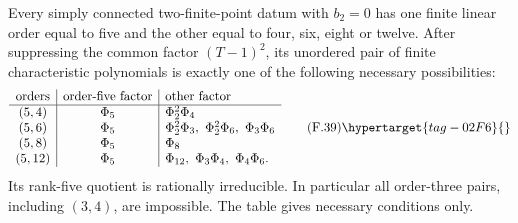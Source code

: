 \begin{theorem}\hypertarget{tag-02N3}{}\label{maps:src:F.2.14}


Every simply connected two-finite-point datum with $b_2=0$ has
one finite linear order equal to five and the other equal
to four, six, eight or twelve.
After suppressing the common factor $(T-1)^2$, its unordered
pair of finite characteristic polynomials is exactly one
of the following necessary possibilities:
\[
\begin{array}{c|c|l}
 \text{orders}&\text{order-five factor}&\text{other factor}\\\hline
 (5,4)&\Phi_5&\Phi_2^2\Phi_4\\
 (5,6)&\Phi_5&\Phi_2^2\Phi_3,\ \Phi_2^2\Phi_6,\ \Phi_3\Phi_6\\
 (5,8)&\Phi_5&\Phi_8\\
 (5,12)&\Phi_5&\Phi_{12},\ \Phi_3\Phi_4,\ \Phi_4\Phi_6.
\end{array}
 \tag{F.39}\hypertarget{tag-02F6}{}\label{maps:eq:F.39}
\]
Its rank-five quotient is rationally irreducible.
In particular all order-three pairs, including $(3,4)$,
are impossible.  The table gives necessary conditions only.

\end{theorem}


